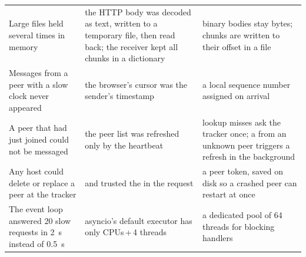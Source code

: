 \begin{table}[H]
\begin{tabularx}{\textwidth}{@{}>{\raggedright\arraybackslash}p{3.6cm} Y Y@{}}
Large files held several times in memory &
the HTTP body was decoded as text, written to a temporary file, then read back; the receiver kept all chunks in a dictionary &
binary bodies stay bytes; chunks are written to their offset in a  file \\
Messages from a peer with a slow clock never appeared &
the browser's cursor was the sender's timestamp &
a local sequence number assigned on arrival \\
A peer that had just joined could not be messaged &
the peer list was refreshed only by the heartbeat &
lookup misses ask the tracker once; a  from an unknown peer triggers a refresh in the background \\
Any host could delete or replace a peer at the tracker &
 and  trusted the  in the request &
a peer token, saved on disk so a crashed peer can restart at once \\
The event loop answered 20 slow requests in \SI{2}{s} instead of \SI{0.5}{s} &
asyncio's default executor has only CPUs\,+\,4 threads &
a dedicated pool of 64 threads for blocking handlers \\
\bottomrule
\end{tabularx}
\end{table}

